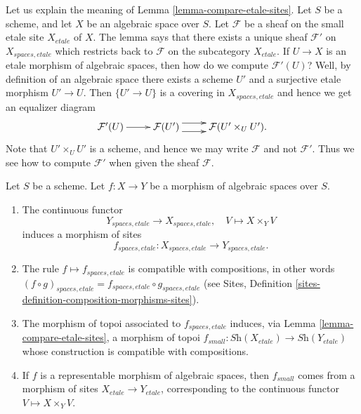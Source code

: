 \begin{remark}
\label{remark-explain-equivalence}
Let us explain the meaning of Lemma \ref{lemma-compare-etale-sites}.
Let $S$ be a scheme, and let $X$ be an algebraic space over $S$.
Let $\mathcal{F}$ be a sheaf on the small etale site $X_{etale}$ of $X$.
The lemma says that there exists a unique sheaf $\mathcal{F}'$ on
$X_{spaces, etale}$ which restricts back to $\mathcal{F}$ on the
subcategory $X_{etale}$. If $U \to X$ is an etale morphism of algebraic
spaces, then how do we compute $\mathcal{F}'(U)$? Well, by definition
of an algebraic space there exists a scheme $U'$ and a surjective
etale morphism $U' \to U$. Then $\{U' \to U\}$ is a covering in
$X_{spaces, etale}$ and hence we get an equalizer diagram
$$
\xymatrix{
\mathcal{F}'(U) \ar[r] &
\mathcal{F}(U') \ar@<1ex>[r] \ar@<-1ex>[r] &
\mathcal{F}(U' \times_U U').
}
$$
Note that $U' \times_U U'$ is a scheme, and hence we may
write $\mathcal{F}$ and not $\mathcal{F}'$.
Thus we see how to compute $\mathcal{F}'$
when given the sheaf $\mathcal{F}$.
\end{remark}

\begin{lemma}
\label{lemma-functoriality-etale-site}
Let $S$ be a scheme.
Let $f : X \to Y$ be a morphism of algebraic spaces over $S$.
\begin{enumerate}
\item The continuous functor
$$
Y_{spaces, etale} \longrightarrow X_{spaces, etale}, \quad
V \longmapsto X \times_Y V
$$
induces a morphism of sites
$$
f_{spaces, etale} : X_{spaces, etale} \to Y_{spaces, etale}.
$$
\item The rule $f \mapsto f_{spaces, etale}$ is compatible with
compositions, in other words $(f \circ g)_{spaces, etale}
= f_{spaces, etale} \circ g_{spaces, etale}$ (see
Sites, Definition \ref{sites-definition-composition-morphisms-sites}).
\item The morphism of topoi associated to $f_{spaces, etale}$
induces, via Lemma \ref{lemma-compare-etale-sites}, a morphism of topoi
$f_{small} : \textit{Sh}(X_{etale}) \to \textit{Sh}(Y_{etale})$
whose construction is compatible with compositions.
\item If $f$ is a representable morphism of algebraic spaces,
then $f_{small}$ comes from a morphism of sites $X_{etale} \to Y_{etale}$,
corresponding to the continuous functor $V \mapsto X \times_Y V$.
\end{enumerate}
\end{lemma}

